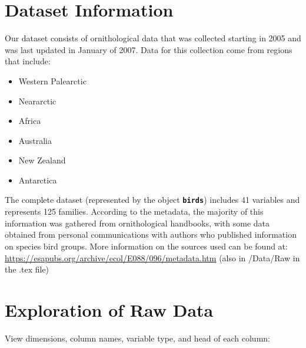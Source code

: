 \documentclass[
  12pt,
]{article}
\providecommand{\tightlist}{%
  \setlength{\itemsep}{0pt}\setlength{\parskip}{0pt}}
\begin{document}
\hypertarget{dataset-information}{%
\section{Dataset Information}\label{dataset-information}}

Our dataset consists of ornithological data that was collected starting
in 2005 and was last updated in January of 2007. Data for this
collection come from regions that include:

\begin{itemize}
\tightlist
\item
  Western Palearctic
\item
  Neararctic
\item
  Africa
\item
  Australia
\item
  New Zealand
\item
  Antarctica
\end{itemize}

The complete dataset (represented by the object \textbf{\texttt{birds}})
includes 41 variables and represents 125 families. According to the
metadata, the majority of this information was gathered from
ornithological handbooks, with some data obtained from personal
communications with authors who published information on species bird
groups. More information on the sources used can be found at:
\url{https://esapubs.org/archive/ecol/E088/096/metadata.htm} (also in
/Data/Raw in the .tex file)

\newpage

\hypertarget{exploration-of-raw-data}{%
\section{Exploration of Raw Data}\label{exploration-of-raw-data}}

View dimensions, column names, variable type, and head of each column:
\end{document}
